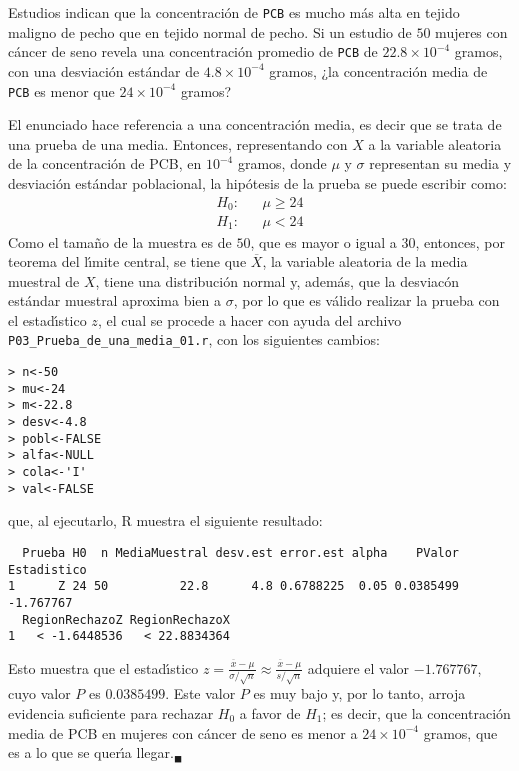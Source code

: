 \begin{enunciado}
 Estudios indican que la concentraci\'on de \texttt{PCB} es mucho
 m\'as alta en tejido maligno de pecho que en tejido normal de pecho.
 Si un estudio de $50$ mujeres con c\'ancer de seno revela
 una concentraci\'on promedio de \texttt{PCB} de $22.8 \times 10^{-4}$
 gramos, con una desviaci\'on est\'andar de $4.8 \times 10^{-4}$ gramos,
 ¿la concentraci\'on media de \texttt{PCB} es menor
 que $24 \times 10^{-4}$ gramos?
\end{enunciado}

\begin{solucion}
 El enunciado hace referencia a una concentraci\'on media,
 es decir que se trata de una prueba de una media.
 Entonces, representando con $X$ a la variable aleatoria
 de la concentraci\'on de PCB, en $10^{-4}$ gramos,
 donde $\mu$ y $\sigma$ representan su media y desviaci\'on
 est\'andar poblacional,
 la hip\'otesis de la prueba se puede escribir como:
 \begin{eqnarray*}
  H_0: & & \mu \geq 24 \\
  H_1: & & \mu   <  24
 \end{eqnarray*}
 Como el tama\~no de la muestra es de $50$, que es mayor o igual a $30$,
 entonces, por teorema del l\'{\i}mite central, se tiene
 que $\overline{X}$, la variable aleatoria de la media muestral de $X$,
 tiene una distribuci\'on normal
 y, adem\'as, que la desviac\'on est\'andar muestral aproxima bien
 a $\sigma$, por lo que es v\'alido realizar la prueba
 con el estad\'{\i}stico $z$, el cual se procede a hacer
 con ayuda del archivo \texttt{P03\_Prueba\_de\_una\_media\_01.r},
 con los siguientes cambios:
 \begin{verbatim}
> n<-50
> mu<-24
> m<-22.8
> desv<-4.8
> pobl<-FALSE
> alfa<-NULL
> cola<-'I'
> val<-FALSE
 \end{verbatim}
 \vspace{-0.5cm}
 que, al ejecutarlo, R muestra el siguiente resultado:
 \begin{verbatim}
  Prueba H0  n MediaMuestral desv.est error.est alpha    PValor Estadistico
1      Z 24 50          22.8      4.8 0.6788225  0.05 0.0385499   -1.767767
  RegionRechazoZ RegionRechazoX
1   < -1.6448536   < 22.8834364
 \end{verbatim}
 \vspace{-0.5cm}
 Esto muestra que el estad\'{\i}stico
 $z = \frac{\overline{x} - \mu}{\sigma/\sqrt{n}} \approx \frac{\overline{x} - \mu}{s/\sqrt{n}}$ adquiere el valor $-1.767767$,
 cuyo valor $P$ es $0.0385499$.
 Este valor $P$ es muy bajo y, por lo tanto, arroja evidencia suficiente
 para rechazar $H_0$ a favor de $H_1$;
 es decir, que la concentraci\'on media de PCB en mujeres
 con c\'ancer de seno es menor a $24\times 10^{-4}$ gramos,
 que es a lo que se quer\'{\i}a llegar.${}_{\blacksquare}$
\end{solucion}
